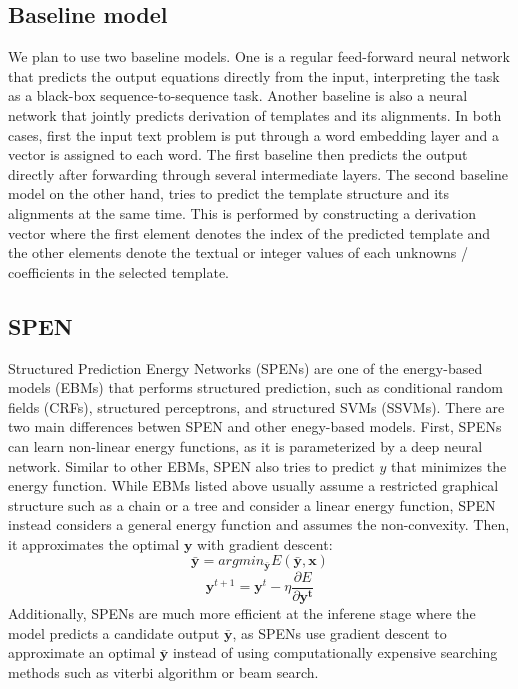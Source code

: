 \documentclass[11pt,letterpaper]{article}
\begin{document}
\subsection{Baseline model}
We plan to use two baseline models. One is a regular feed-forward neural network that predicts the output equations directly from the input, interpreting the task as a black-box sequence-to-sequence task. Another baseline is also a neural network that jointly predicts derivation of templates and its alignments. In both cases, first the input text problem is put through a word embedding layer and a vector is assigned to each word. The first baseline then predicts the output directly after forwarding through several intermediate layers. The second baseline model on the other hand, tries to predict the template structure and its alignments at the same time. This is performed by constructing a derivation vector where the first element denotes the index of the predicted template and the other elements denote the textual or integer values of each unknowns / coefficients in the selected template.
\subsection{SPEN}
Structured Prediction Energy Networks (SPENs) \cite{DBLP:journals/corr/BelangerM15}\cite{DBLP:conf/icml/BelangerYM17} are one of the energy-based models (EBMs) that performs structured prediction, such as conditional random fields (CRFs), structured perceptrons, and structured SVMs (SSVMs).
There are two main differences betwen SPEN and other enegy-based models. First, SPENs can learn non-linear energy functions, as it is parameterized by a deep neural network. Similar to other EBMs, SPEN also tries to predict $y$ that minimizes the energy function. While EBMs listed above usually assume a restricted graphical structure such as a chain or a tree and consider a linear energy function, SPEN instead considers a general energy function and assumes the non-convexity. Then, it approximates the optimal $\mathbf{y}$ with gradient descent:
\begin{equation}
\mathbf{\bar{y}} = argmin_{\mathbf{\bar{y}}} E( \mathbf{\bar{y}}, \mathbf{x} )
\end{equation}
\begin{equation}
\mathbf{y}^{t+1} = \mathbf{y}^t - \eta \frac{ \partial E }{ \partial \mathbf{y^t}}
\end{equation}
Additionally, SPENs are much more efficient at the inferene stage where the model predicts a candidate output $\bar{\mathbf{y}}$, as SPENs use gradient descent to approximate an optimal $\bar{\mathbf{y}}$ instead of using computationally expensive searching methods such as viterbi algorithm or beam search.
\end{document}
